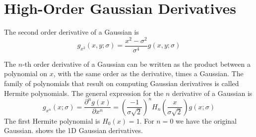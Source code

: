 \section{High-Order Gaussian Derivatives}


The second order derivative of a Gaussian is
\begin{equation}
	g_{x^2}(x,y; \sigma) = \frac{x^2-\sigma^2}{\sigma^4} g(x,y; \sigma)
	\label{eq:derivate2gauss2dcont}
\end{equation}


The $n$-th order derivative of a Gaussian can be written as the product between a polynomial on $x$, with the same order as the derivative, times a Gaussian. The family of polynomials that result on computing Gaussian derivatives is called Hermite polynomials. The general expression for the $n$ derivative of a Gaussian is
\begin{equation}
	g_{x^n}(x; \sigma) =
	\frac{\partial^{n} g(x)}{\partial x^n}
	=
	\left( \frac{-1}{\sigma \sqrt{2}} \right)^n
	H_n\left( \frac{x}{\sigma \sqrt {2}} \right)
	g(x; \sigma)
	\label{eq:derivate2gauss1dhermite}
\end{equation}
The first Hermite polynomial is $H_0(x)=1$.
For $n=0$ we have the original Gaussian. \Fig{\ref{fig:gaussian_gaussiander}} shows the 1D Gaussian derivatives.

